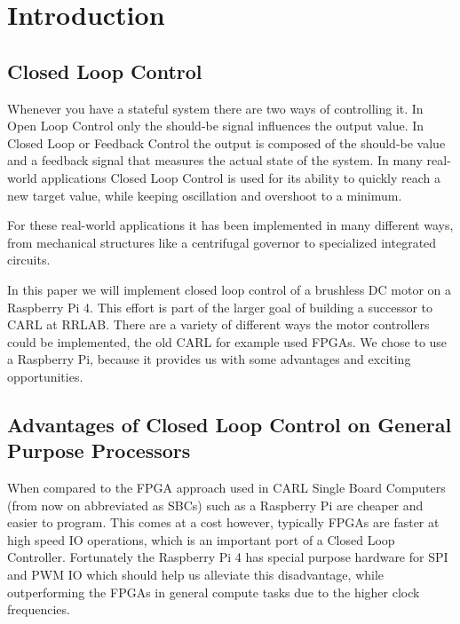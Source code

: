 \chapter{Introduction}
\label{chap:introduction}

\begin{comment}
Rust as new language competitive to C?
Bare-metal still necessary with modern Microprocessors and Real-time Linux?
What if we want to implement something different from linear control?
\end{comment}

\section{Closed Loop Control}
\label{sec:introduction:clc}

Whenever you have a stateful system there are two ways of controlling it.
In Open Loop Control only the should-be signal influences the output value.
In Closed Loop or Feedback Control the output is composed of the should-be value and a feedback signal that measures the actual state of the system.
In many real-world applications Closed Loop Control is used for its ability to quickly reach a new target value, while keeping oscillation and overshoot to a minimum.

For these real-world applications it has been implemented in many different ways,
from mechanical structures like a centrifugal governor to specialized integrated circuits.

In this paper we will implement closed loop control of a brushless DC motor on a Raspberry Pi 4.
This effort is part of the larger goal of building a successor to CARL\cite{CARL} at RRLAB.
There are a variety of different ways the motor controllers could be implemented, the old CARL for example used FPGAs.
We chose to use a Raspberry Pi, because it provides us with some advantages and exciting opportunities.

\section{Advantages of Closed Loop Control on General Purpose Processors}
\label{sec:introduction:gpp}

When compared to the FPGA approach used in CARL Single Board Computers (from now on abbreviated as SBCs) such as a Raspberry Pi are cheaper and easier to program.
This comes at a cost however, typically FPGAs are faster at high speed IO operations, which is an important port of a Closed Loop Controller.
Fortunately the Raspberry Pi 4 has special purpose hardware for SPI and PWM IO which should help us alleviate this disadvantage,
while outperforming the FPGAs in general compute tasks due to the higher clock frequencies.

